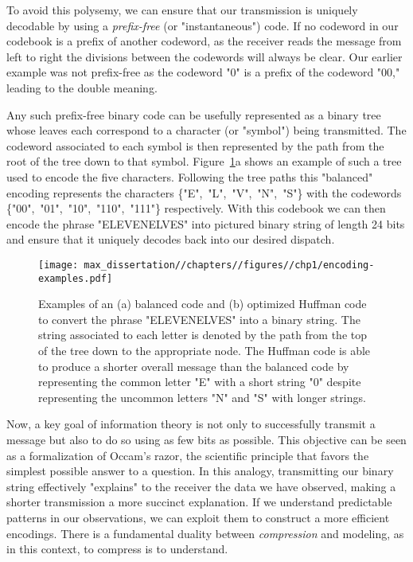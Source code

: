 To avoid this polysemy, we can ensure that our transmission is uniquely decodable by using a \emph{prefix-free} (or "instantaneous") code. If no codeword in our codebook is a prefix of another codeword, as the receiver reads the message from left to right the divisions between the codewords will always be clear. Our earlier example was not prefix-free as the codeword "0" is a prefix of the codeword "00," leading to the double meaning. 

Any such prefix-free binary code can be usefully represented as a binary tree whose leaves each correspond to a character (or "symbol") being transmitted. The codeword associated to each symbol is then represented by the path from the root of the tree down to that symbol. Figure~\ref{fig:encoding-examples}a shows an example of such a tree used to encode the five characters. Following the tree paths this "balanced" encoding represents the characters \{"E",~"L",~"V",~"N",~"S"\} with the codewords \{"00",~"01",~"10",~"110",~"111"\} respectively. With this codebook we can then encode the phrase "ELEVENELVES" into pictured binary string of length 24 bits and ensure that it uniquely decodes back into our desired dispatch.

\begin{figure}
    \centering
    \texttt{[image: max\_dissertation//chapters//figures//chp1/encoding-examples.pdf]}
    \caption{Examples of an (a) balanced code and (b) optimized Huffman code to convert the phrase "ELEVENELVES" into a binary string. The string associated to each letter is denoted by the path from the top of the tree down to the appropriate node. The Huffman code is able to produce a shorter overall message than the balanced code by representing the common letter "E" with a short string "0" despite representing the uncommon letters "N" and "S" with longer strings.}
    \label{fig:encoding-examples}
\end{figure}

Now, a key goal of information theory is not only to successfully transmit a message but also to do so using as few bits as possible. This objective can be seen as a formalization of Occam's razor, the scientific principle that favors the simplest possible answer to a question. In this analogy, transmitting our binary string effectively "explains" to the receiver the data we have observed, making a shorter transmission a more succinct explanation. If we understand predictable patterns in our observations, we can exploit them to construct a more efficient encodings. There is a fundamental duality between \emph{compression} and modeling, as in this context, to compress is to understand. 

